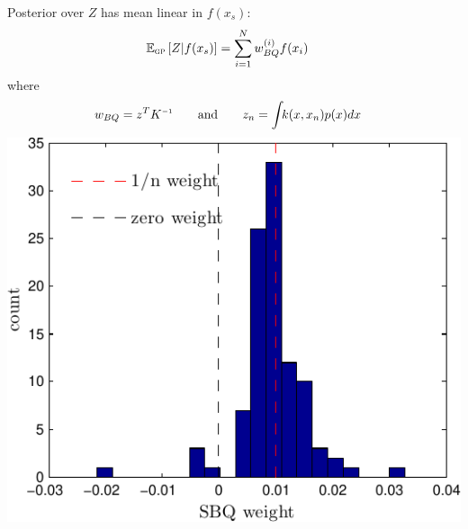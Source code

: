 \documentclass[usenames,dvipsnames]{beamer}
\begin{document}
\begin{frame}[plain, t]
{\begin{itemize}
			\end{itemize}   		
	}
\end{frame}



\begin{frame}[plain, t]
	\titlebodyskip

Posterior over $Z$ has mean linear in $f(x_s)$:
\begin{align*}
\expectargs{\gp}{Z|f(x_s)} %
  & = \sum_{i=1}^N w_{\small{BQ}}^{(i)} \vf(\vx_i)
  \end{align*}
  where
  \begin{align*} 
 w_{\small{BQ}} & = \vz^T K\inv \qquad \textrm{and} \qquad z_n = \int\!\! k(\vx, \vx_n) p(\vx) d\vx
\end{align*} 
\pause
\centering
\includegraphics[width=0.45\columnwidth]{figures/weights_v1_n100}

\end{frame}
\end{document}
